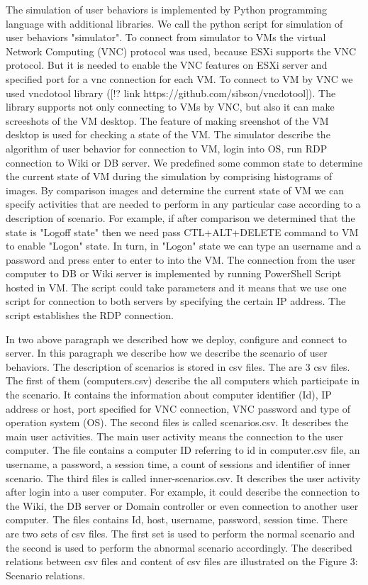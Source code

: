 The simulation of user behaviors is implemented by Python programming language with additional libraries. We call the python script for simulation of user behaviors "simulator". To connect from simulator to VMs the virtual Network Computing (VNC) protocol was used, because ESXi supports the VNC protocol. But it is needed to enable the VNC features on ESXi server and specified port for a vnc connection for each VM. To connect to VM by VNC we used vncdotool library ([!? link  https://github.com/sibson/vncdotool]). The library supports not only connecting to VMs by VNC, but also it can make screeshots of the VM desktop. The feature of making sreenshot of the VM desktop is used for checking a state of the VM. The simulator describe the algorithm of user behavior for connection to VM, login into OS, run RDP connection to Wiki or DB server. We predefined some common state to determine the current state of VM during the simulation by comprising histograms of images. By comparison images and determine the current state of VM we can specify activities that are needed to perform in any particular case according to a description of scenario. For example, if after comparison we determined that the state is "Logoff state" then we need pass CTL+ALT+DELETE command to VM to enable "Logon" state. In turn, in "Logon" state we can type an username and a password and press enter to enter to into the VM. The connection from the user computer to DB or Wiki server is implemented by running PowerShell Script hosted in VM. The script could take parameters and it means that we use one script for connection to both servers by specifying the certain IP address. The script establishes the RDP connection. 

In two above paragraph we described how we deploy, configure and connect to server. In this paragraph we describe how we describe the scenario of user behaviors. The description of scenarios is stored in csv files. The are 3 csv files. The first of them (computers.csv) describe the all computers which participate in the scenario. It contains the information about computer identifier (Id), IP address or host, port specified for VNC connection, VNC password and type of operation system (OS).
The second files is called scenarios.csv. It describes the main user activities. The main user activity means the connection to the user computer. The file contains a computer ID referring to id in computer.csv file, an username, a password, a session time, a count of sessions and identifier of inner scenario. The third files is called inner-scenarios.csv. It describes the user activity after login into a user computer. For example, it could describe the connection to the Wiki, the DB server or Domain controller or even connection to another user computer. The files contains Id, host, username, password, session time. There are two sets of csv files. The first set is used to perform the normal scenario and the second is used to perform the abnormal scenario accordingly. The described relations between csv files and content of csv files are illustrated on the Figure 3: Scenario relations.
 	
